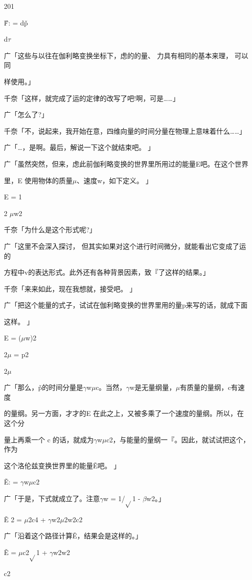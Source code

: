 201\par
F̌: = dp̌\par
d$\tau$\par
广「这些与以往在伽利略变换坐标下，虑的的量、 力具有相同的基本来理， 可以同\par
样使用。」\par
千奈「这样，就完成了运的定律的改写了吧!啊，可是……」\par
广「怎么了?」\par
千奈「不，说起来，我开始在意，四维向量的时间分量在物理上意味着什么……」\par
广「…，是啊。最后，解说一下这个就结束吧。 」\par
广「虽然突然，但来，虑此前伽利略变换的世界里所用过的能量E吧。在这个世界\par
里，E 使用物体的质量$\mu$、速度w，如下定义。 」\par
E = 1\par
2 $\mu$w2\par
千奈「为什么是这个形式呢?」\par
广「这里不会深入探讨， 但其实如果对这个进行时间微分，就能看出它变成了运的\par
方程中v的表达形式。此外还有各种背景因素，致『了这样的结果。」\par
千奈「来来如此，现在我想就，接受吧。 」\par
广「把这个能量的式子，试试在伽利略变换的世界里用的量p来写的话，就成下面\par
这样。 」\par
E = ($\mu$w)2\par
2$\mu$ = p2\par
2$\mu$\par
广「那么，p̌的时间分量是$\gamma$w$\mu$c。当然，$\gamma$w是无量纲量，$\mu$有质量的量纲，c有速度\par
的量纲。另一方面，才才的E 在此之上，又被多乘了一个速度的量纲。所以，在这个分\par
量上再乘一个 c 的话，就成为$\gamma$w$\mu$c2，与能量的量纲一『。因此，就试试把这个，作为\par
这个洛伦兹变换世界里的能量Ě吧。 」\par
Ě: = $\gamma$w$\mu$c2\par
广「于是，下式就成立了。注意$\gamma$w = 1/$\sqrt{}$1 - $\beta$w2。」\par
Ě 2 = $\mu$2c4 + $\gamma$w2$\mu$2w2c2\par
广「沿着这个路径计算Ě，结果会是这样的。」\par
Ě = $\mu$c2$\sqrt{}$1 + $\gamma$w2w2\par
c2\par

